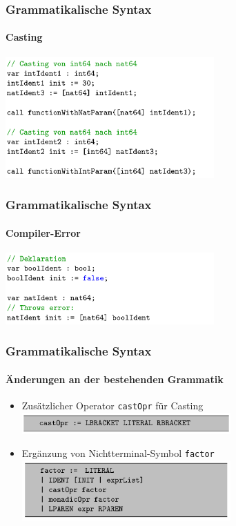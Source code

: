\documentclass{beamer}
\begin{document}
    \begin{frame}
        \frametitle{Grammatikalische Syntax}
        \framesubtitle{Casting}
        {\includegraphics[width=8cm]{listing_3.png}}
    \end{frame}

    \begin{frame}
        \frametitle{Grammatikalische Syntax}
        \framesubtitle{Compiler-Error}
        {\includegraphics[width=8cm]{listing_4.png}}
    \end{frame}

    \begin{frame}
        \frametitle{Grammatikalische Syntax}
        \framesubtitle{Änderungen an der bestehenden Grammatik}

        \begin{itemize}
            \item Zusätzlicher Operator \texttt{castOpr} für Casting
            {\includegraphics[width=8cm]{listing_5.png}}
            \item Ergänzung von Nichtterminal-Symbol \texttt{factor}
            {\includegraphics[width=8cm]{listing_6.png}}
        \end{itemize}
        \vspace{30}
    \end{frame}
\end{document}
